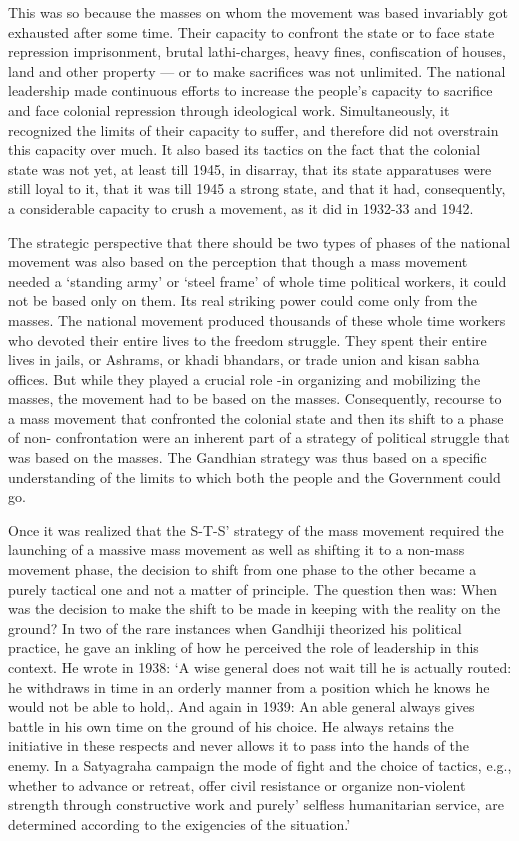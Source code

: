 This was so because the masses on whom the movement was based invariably got exhausted after some time. Their capacity to confront the state or to face state repression imprisonment, brutal lathi-charges, heavy fines, confiscation of houses, land and other property — or to make sacrifices was not unlimited. The national leadership made continuous efforts to increase the people's capacity to sacrifice and face colonial repression through ideological work. Simultaneously, it recognized the limits of their capacity to suffer, and therefore did not overstrain this capacity over much. It also based its tactics on the fact that the colonial state was not yet, at least till 1945, in disarray, that its state apparatuses were still loyal to it, that it was till 1945 a strong state, and that it had, consequently, a considerable capacity to crush a movement, as it did in 1932-33 and 1942.

The strategic perspective that there should be two types of phases of the national movement was also based on the perception that though a mass movement needed a `standing army' or `steel frame' of whole time political workers, it could not be based only on them. Its real striking power could come only from the masses. The national movement produced thousands of these whole time workers who devoted their entire lives to the freedom struggle. They spent their entire lives in jails, or Ashrams, or khadi bhandars, or trade union and kisan sabha offices. But while they played a crucial role -in organizing and mobilizing the masses, the movement had to be based on the masses. Consequently, recourse to a mass movement that confronted the colonial state and then its shift to a phase of non- confrontation were an inherent part of a strategy of political struggle that was based on the masses. The Gandhian strategy was thus based on a specific understanding of the limits to which both the people and the Government could go.

Once it was realized that the S-T-S' strategy of the mass movement required the launching of a massive mass movement as well as shifting it to a non-mass movement phase, the decision to shift from one phase to the other became a purely tactical one and not a matter of principle. The question then was: When was the decision to make the shift to be made in keeping with the reality on the ground? In two of the rare instances when Gandhiji theorized his political practice, he gave an inkling of how he perceived the role of leadership in this context. He wrote in 1938: `A wise general does not wait till he is actually routed: he withdraws in time in an orderly manner from a position which he knows he would not be able to hold,. And again in 1939: An able general always gives battle in his own time on the ground of his choice. He always retains the initiative in these respects and never allows it to pass into the hands of the enemy. In a Satyagraha campaign the mode of fight and the choice of tactics, e.g., whether to advance or retreat, offer civil resistance or organize non-violent strength through constructive work and purely' selfless humanitarian service, are determined according to the exigencies of the situation.'

